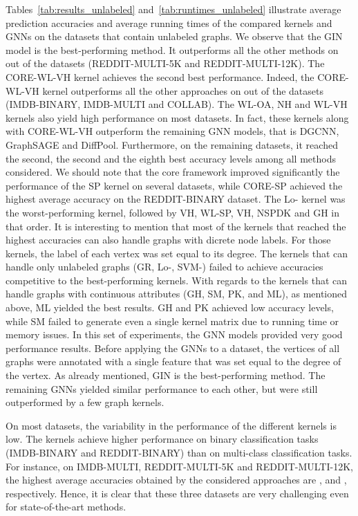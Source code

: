 \documentclass[twoside,11pt]{article}
\begin{document}
Tables~\ref{tab:results_unlabeled} and~\ref{tab:runtimes_unlabeled} illustrate average prediction accuracies and average running times of the compared kernels and GNNs on the  datasets that contain unlabeled graphs.
We observe that the GIN model is the best-performing method.
It outperforms all the other methods on  out of the  datasets (REDDIT-MULTI-5K and REDDIT-MULTI-12K).
The CORE-WL-VH kernel achieves the second best performance.
Indeed, the CORE-WL-VH kernel outperforms all the other approaches on  out of the  datasets (IMDB-BINARY, IMDB-MULTI and COLLAB).
The WL-OA, NH and WL-VH kernels also yield high performance on most datasets.
In fact, these kernels along with CORE-WL-VH outperform the remaining  GNN models, that is DGCNN, GraphSAGE and DiffPool.
Furthermore, on the remaining datasets, it reached the second, the second and the eighth best accuracy levels among all methods considered.
We should note that the core framework improved significantly the performance of the SP kernel on several datasets, while CORE-SP achieved the highest average accuracy on the REDDIT-BINARY dataset.
The Lo- kernel was the worst-performing kernel, followed by VH, WL-SP, VH, NSPDK and GH in that order.
It is interesting to mention that most of the kernels that reached the highest accuracies can also handle graphs with dicrete node labels.
For those kernels, the label of each vertex was set equal to its degree.
The kernels that can handle only unlabeled graphs (GR, Lo-, SVM-) failed to achieve accuracies competitive to the best-performing kernels.
With regards to the kernels that can handle graphs with continuous attributes (GH, SM, PK, and ML), as mentioned above, ML yielded the best results.
GH and PK achieved low accuracy levels, while SM failed to generate even a single kernel matrix due to running time or memory issues.
In this set of experiments, the  GNN models provided very good performance results.
Before applying the GNNs to a dataset, the vertices of all graphs were annotated with a single feature that was set equal to the degree of the vertex.
As already mentioned, GIN is the best-performing method.
The remaining  GNNs yielded similar performance to each other, but were still outperformed by a few graph kernels.

On most datasets, the variability in the performance of the different kernels is low.
The kernels achieve higher performance on binary classification tasks (IMDB-BINARY and REDDIT-BINARY) than on multi-class classification tasks.
For instance, on IMDB-MULTI, REDDIT-MULTI-5K and REDDIT-MULTI-12K, the highest average accuracies obtained by the considered approaches are ,  and , respectively.
Hence, it is clear that these three datasets are very challenging even for state-of-the-art methods.
\end{document}
